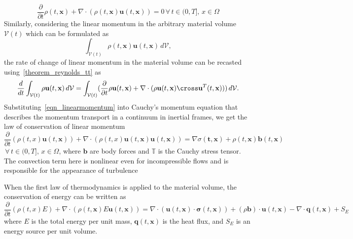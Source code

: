 \begin{equation}\label{theorem_cont_eqn}
    \frac{\partial}{\partial t}\rho (t, \mathbf{x}) + \nabla \cdot (\rho (t, \mathbf{x}) \mathbf{u}(t, \mathbf{x})) = 0\,\forall\,t \in (0, T],\,x \in \Omega
\end{equation}
Similarly, considering the linear momentum in the arbitrary material volume $\mathcal{V}(t)$ which can be formulated as 
\begin{equation*}
        \int_{\mathcal{V}(t)} \rho(t, \mathbf{x}) \mathbf{u}(t, \mathbf{x})\,d \mathcal{V},
\end{equation*}
the rate of change of linear momentum in the material volume can be recasted using~\ref{theorem_reynolds_tt} as
\begin{equation}\label{eqn_linearmomentum}
    \frac{d}{dt} \int_{\mathcal{V}(t)} \rho \mathbf{u}(t, \mathbf{x})\,d \mathcal{V} = \int_{\mathcal{V}(t)}(
        \frac{\partial}{\partial t} \rho \mathbf{u}(t, \mathbf{x}) + \nabla \cdot (\rho \mathbf{u}(t, \mathbf{x}) \cross \mathbf{u}^{T}(t, \mathbf{x}))
        )\,d \mathcal{V}.
\end{equation}
Substituting~\ref{eqn_linearmomentum} into Cauchy's momentum equation that describes the momentum transport in a continuum in inertial frames, we get the law of
conservation of linear momentum
\begin{equation}\label{theorem_momentum_eqn}
    \frac{\partial}{\partial t}(\rho(t,x) \mathbf{u}(t, \mathbf{x})) + \nabla \cdot (\rho(t,x) \mathbf{u}(t, \mathbf{x})\mathbf{u}(t, \mathbf{x})) =
    \nabla \mathbf{\mathbb{\sigma}(t, \mathbf{x})} + \rho(t, \mathbf{x}) \mathbf{b}(t, \mathbf{x})
\end{equation}
$\,\forall\,t \in (0, T],\,x \in \Omega$, where $\mathbf{b}$ are body forces and $\mathbf{\mathbb{T}}$ is the Cauchy stress tensor.
The convection term here is nonlinear even for incompressible flows and is responsible for the appearance of turbulence~\cite{hirschNumericalComputationInternal2007}

When the first law of thermodynamics is applied to the material volume, the conservation of energy can be written as
\begin{equation}\label{theorem_energy_eqn}
    \frac{\partial}{\partial t}(\rho(t,x)E) + \nabla \cdot (\rho(t, \mathbf{x}) E \mathbf{u}(t, \mathbf{x}))
    = \nabla \cdot (\mathbf{u}(t, \mathbf{x}) \cdot \mathbf{\sigma}(t,\mathbf{x})) + (\rho \mathbf{b}) \cdot \mathbf{u}(t, \mathbf{x})
        -\nabla\cdot\mathbf{q}(t, \mathbf{x}) + S_{E}
\end{equation}
where $E$ is the total energy per unit mass, $\mathbf{q}(t, \mathbf{x})$ is the heat flux, and $S_{E}$ is an energy source per unit volume.
